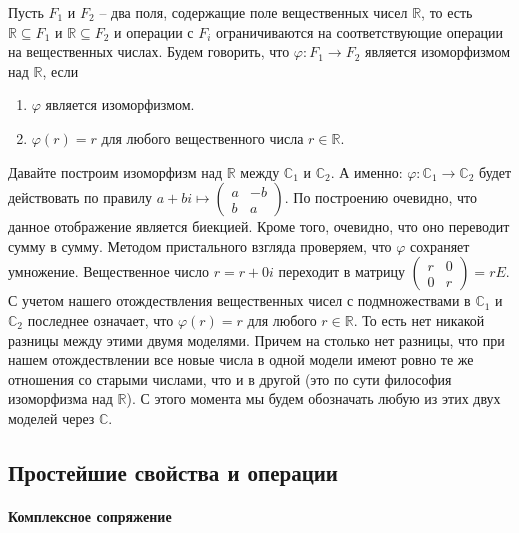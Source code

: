 \begin{definition}
Пусть $F_1$ и $F_2$ -- два поля, содержащие поле вещественных чисел $\mathbb R$, то есть $\mathbb R\subseteq F_1$ и $\mathbb R\subseteq F_2$ и операции с $F_i$ ограничиваются на соответствующие операции на вещественных числах.
Будем говорить, что $\varphi\colon F_1\to F_2$ является изоморфизмом над $\mathbb R$, если 
\begin{enumerate}
\item $\varphi$ является изоморфизмом.

\item $\varphi(r) = r$ для любого вещественного числа $r\in \mathbb R$.
\end{enumerate}
\end{definition}

Давайте построим изоморфизм над $\mathbb R$ между $\mathbb C_1$ и $\mathbb C_2$.
А именно: $\varphi\colon \mathbb C_1\to \mathbb C_2$ будет действовать по правилу $a+bi \mapsto \left(\begin{smallmatrix}{a}&{-b}\\{b}&{a}\end{smallmatrix}\right)$.
По построению очевидно, что данное отображение является биекцией.
Кроме того, очевидно, что оно переводит сумму в сумму.
Методом пристального взгляда проверяем, что $\varphi$ сохраняет умножение.
Вещественное число $r = r + 0i$ переходит в матрицу $\left(\begin{smallmatrix}{r}&{0}\\{0}&{r}\end{smallmatrix}\right) = rE$.
С учетом нашего отождествления вещественных чисел с подмножествами в $\mathbb C_1$ и $\mathbb C_2$ последнее означает, что $\varphi(r) = r$ для любого $r\in\mathbb R$.
То есть нет никакой разницы между этими двумя моделями.
Причем на столько нет разницы, что при нашем отождествлении все новые числа в одной модели имеют ровно те же отношения со старыми числами, что и в другой (это по сути философия изоморфизма над $\mathbb R$).
С этого момента мы будем обозначать любую из этих двух моделей через $\mathbb C$.

\subsection{Простейшие свойства и операции}

\paragraph{Комплексное сопряжение}


